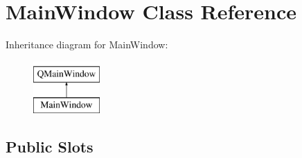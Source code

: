 \hypertarget{classMainWindow}{}\section{Main\+Window Class Reference}
\label{classMainWindow}
Inheritance diagram for Main\+Window\+:\begin{figure}[H]
\begin{center}
\leavevmode
\includegraphics[height=2.000000cm]{classMainWindow}
\end{center}
\end{figure}
\subsection*{Public Slots}
